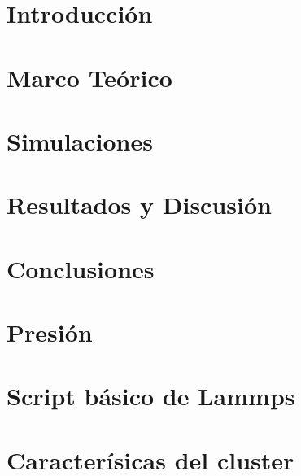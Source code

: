 \documentclass[a4paper,12pt]{report}
\begin{document}
 


\section*{}

\tableofcontents
\chapter{Introducción}

\chapter{Marco Teórico}
 
\chapter{Simulaciones}

\chapter{Resultados y Discusión}

\chapter{Conclusiones}

\begin{appendices}
\chapter{Presión}

\chapter{Script básico de Lammps}

\chapter{Caracterísicas del cluster}

\end{appendices}

\end{document}
